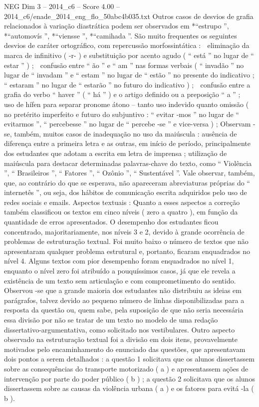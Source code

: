 \begin{textsample}{NEG Dim 3 – 2014\_c6 – Score 4.00 – 2014\_c6/enade\_2014\_eng\_flo\_50abc4b035.txt}
Outros casos de desvios de grafia relacionados à variação diastrática podem ser observados em *“estrupo ”, *“automovís ”, *“viensse ”, *“camihada ”.
São muito frequentes os seguintes desvios de caráter ortográfico, com repercussão morfossintática :  eliminação da marca de infinitivo ( -r- ) e substituição por acento agudo ( “ está ” no lugar de “ estar ” ) ;  confusão entre “ ão ” e “ am ” nas formas verbais ( “ invadão ” no lugar de “ invadam ” e “ estam ” no lugar de “ estão ” no presente do indicativo ; “ estaram ” no lugar de “ estarão ” no futuro do indicativo ) ;  confusão entre a grafia do verbo “ haver ” ( “ há ” ) e o artigo definido ou a preposição “ a ” ;  uso de hífen para separar pronome átono – tanto uso indevido quanto omissão ( no pretérito imperfeito e futuro do subjuntivo : “ evitar -mos ” no lugar de “ evitarmos ”, “ percebesse ” no lugar de “ percebe -se ” e vice-versa ) ; Observam -se, também, muitos casos de inadequação no uso da maiúscula : ausência de diferença entre a primeira letra e as outras, em início de período, principalmente dos estudantes que adotam a escrita em letra de imprensa ; utilização de maiúscula para destacar determinadas palavras-chave do texto, como “ Violência ”, “ Brasileiros ”, “ Fatores ”, “ Ozônio ”, “ Sustentável ”.
Vale observar, também, que, ao contrário do que se esperava, não apareceram abreviaturas próprias do “ internetês ”, ou seja, dos hábitos de comunicação escrita adquiridos pelo uso de redes sociais e emails.
Aspectos textuais : Quanto a esses aspectos a correção também classificou os textos em cinco níveis ( zero a quatro ), em função da quantidade de erros apresentados.
O desempenho dos estudantes ficou concentrado, majoritariamente, nos níveis 3 e 2, devido à grande ocorrência de problemas de estruturação textual.
Foi muito baixo o número de textos que não apresentaram qualquer problema estrutural e, portanto, ficaram enquadrados no nível 4.
Alguns textos com pior desempenho foram enquadrados no nível 1, enquanto o nível zero foi atribuído a pouquíssimos casos, já que ele revela a existência de um texto sem articulação e com comprometimento do sentido.
Observou -se que a grande maioria dos estudantes não distribuiu as ideias em parágrafos, talvez devido ao pequeno número de linhas disponibilizadas para a resposta da questão ou, quem sabe, pela suposição de que não seria necessária essa divisão por não se tratar de um texto no modelo de uma redação dissertativo-argumentativa, como solicitado nos vestibulares.
Outro aspecto observado na estruturação textual foi a divisão em dois itens, provavelmente motivados pelo encaminhamento do enunciado das questões, que apresentavam dois pontos a serem detalhados : a questão 1 solicitava que os alunos dissertassem sobre as consequências do transporte motorizado ( a ) e apresentassem ações de intervenção por parte do poder público ( b ) ; a questão 2 solicitava que os alunos dissertassem sobre as causas da violência urbana ( a ) e os fatores para evitá -la ( b ).

\end{textsample}
